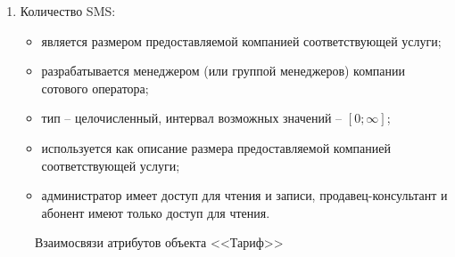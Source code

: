 \begin{enumerate}
\begin{enumerate}
        \item Количество SMS:
        \begin{itemize}
            \item является размером предоставляемой компанией соответствующей услуги;
            \item разрабатывается менеджером (или группой менеджеров) компании сотового оператора;
            \item тип -- целочисленный, интервал возможных значений -- $[0; \infty]$; %
            \item используется как описание размера предоставляемой компанией соответствующей услуги;
            \item администратор имеет доступ для чтения и записи, продавец-консультант и абонент имеют только доступ для чтения.
        \end{itemize}
    \end{enumerate}
    \begin{figure}[H]
        \label{fig:tariff-attributes}
        \caption{Взаимосвязи атрибутов объекта <<Тариф>>}
    \end{figure}


\end{enumerate}
